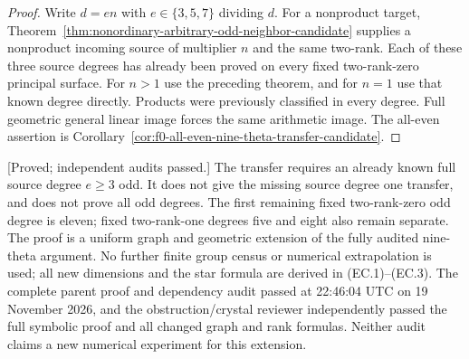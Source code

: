 \begin{proof}
Write $d=en$ with $e\in\{3,5,7\}$ dividing $d$. For a nonproduct
target, Theorem~\ref{thm:nonordinary-arbitrary-odd-neighbor-candidate}
supplies a nonproduct incoming source of multiplier $n$ and the
same two-rank. Each of these three source degrees has already
been proved on every fixed two-rank-zero principal surface.
For $n>1$ use the preceding theorem, and for $n=1$ use that known
degree directly. Products were previously classified in every
degree. Full geometric general linear image forces the same
arithmetic image. The all-even assertion is
Corollary~\ref{cor:f0-all-even-nine-theta-transfer-candidate}.
\end{proof}

\begin{remark}
\label{rem:cubic-component-norm-transfer-scope-candidate}
\textup{[Proved; independent audits passed.]}
The transfer requires an already known full source degree
$e\ge3$ odd. It does not give the missing source degree one
transfer, and does not prove all odd degrees. The first remaining
fixed two-rank-zero odd degree is eleven; fixed two-rank-one
degrees five and eight also remain separate. The proof is a
uniform graph and geometric extension of the fully audited
nine-theta argument. No further finite group census or numerical
extrapolation is used; all new dimensions and the star formula
are derived in (EC.1)--(EC.3). The complete parent proof and dependency audit passed at
22:46:04 UTC on 19 November 2026, and the obstruction/crystal
reviewer independently passed the full symbolic proof and
all changed graph and rank formulas. Neither audit claims
a new numerical experiment for this extension.
\end{remark}
